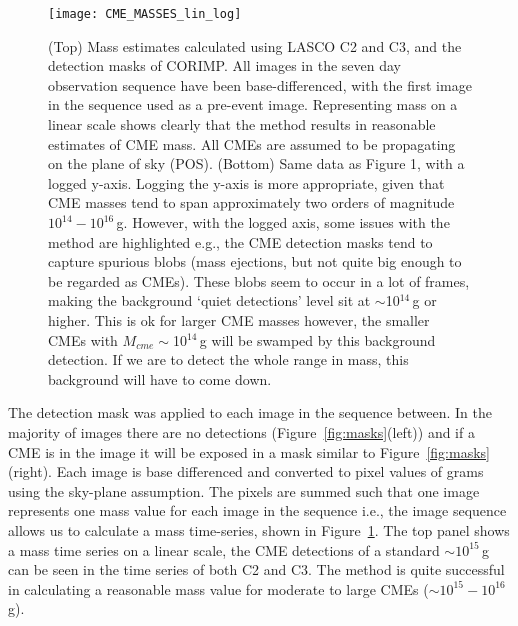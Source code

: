 \begin{figure}[t!]
\begin{center}
\texttt{[image: CME\_MASSES\_lin\_log]}
\caption[CME Mass automatic detection]{(Top) Mass estimates calculated using LASCO C2 and C3, and the detection masks of CORIMP. All images in the seven day observation sequence have been base-differenced, with the first image in the sequence used as a pre-event image. Representing mass on a linear scale shows clearly that the method results in reasonable estimates of CME mass. All CMEs are assumed to be propagating on the plane of sky (POS). 
(Bottom) Same data as Figure 1, with a logged y-axis. Logging the y-axis is more appropriate, given that CME masses tend to span approximately two orders of magnitude $10^{14}-10^{16}$\,g. However, with the logged axis, some issues with the method are highlighted e.g., the CME detection masks tend to capture spurious blobs (mass ejections, but not quite big enough to be regarded as CMEs). These blobs seem to occur in a lot of frames, making the background `quiet detections' level sit at $\sim$10$^{14}$\,g or higher. This is ok for larger CME masses however, the smaller CMEs with $M_{cme}\sim$10$^{14}$\,g will be swamped by this background detection. If we are to detect the whole range in mass, this background will have to come down. }
\label{fig:mass_v_time}
\end{center}
\end{figure}

The detection mask was applied to each image in the sequence between. In the majority of images there are no detections (Figure~\ref{fig:masks}(left)) and if a CME is in the image it will be exposed in a mask similar to Figure~\ref{fig:masks}(right). Each image is base differenced and converted to pixel values of grams using the sky-plane assumption. The pixels are summed such that one image represents one mass value for each image in the sequence i.e., the image sequence allows us to calculate a mass time-series, shown in Figure~\ref{fig:mass_v_time}. The top panel shows a mass time series on a linear scale, the CME detections of a standard $\sim$$10^{15}$\,g can be seen in the time series of both C2 and C3. The method is quite successful in calculating a reasonable mass value for moderate to large CMEs ($\sim$$10^{15}-10^{16}$\,g). 
%

